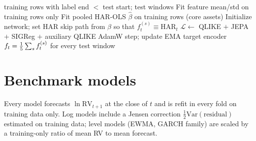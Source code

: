 \documentclass[11pt,a4paper]{article}
\begin{document}
\begin{algorithm}[!htbp]
\caption{Meridian training and forecasting for one walk-forward fold}\label{alg:meridian}
\begin{algorithmic}[1]
\Require training rows with label end $<$ test start; test windows
\State Fit feature mean/std on training rows only
\State Fit pooled HAR-OLS $\hat\beta$ on training rows (core assets)
  \State Initialize network; set HAR skip path from $\hat\beta$ so that $f_t^{(s)} \equiv \text{HAR}_t$
       \State $\mathcal{L} \gets$ QLIKE $+$ JEPA $+$ SIGReg $+$ auxiliary QLIKE \Comment{\S\ref{sec:model}}
       \State AdamW step; update EMA target encoder
     \EndFor
  \EndFor
\EndFor
\State \Return $f_t = \frac{1}{5}\sum_s f_t^{(s)}$ for every test window
\end{algorithmic}
\end{algorithm}

\section{Benchmark models}\label{sec:benchmarks}

Every model forecasts $\ln\mathrm{RV}_{t+1}$ at the close of $t$ and is refit in every fold on
training data only. Log models include a Jensen correction $\tfrac12\mathrm{Var}(\text{residual})$
estimated on training data; level models (EWMA, GARCH family) are scaled by a training-only ratio of
mean RV to mean forecast.
\end{document}
